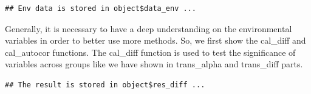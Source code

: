 \documentclass[
]{book}
\newenvironment{Shaded}{\begin{snugshade}}{\end{snugshade}}
\newcommand{\AttributeTok}[1]{\textcolor[rgb]{0.77,0.63,0.00}{#1}}
\newcommand{\CommentTok}[1]{\textcolor[rgb]{0.56,0.35,0.01}{\textit{#1}}}
\newcommand{\DecValTok}[1]{\textcolor[rgb]{0.00,0.00,0.81}{#1}}
\newcommand{\FunctionTok}[1]{\textcolor[rgb]{0.00,0.00,0.00}{#1}}
\newcommand{\NormalTok}[1]{#1}
\newcommand{\SpecialCharTok}[1]{\textcolor[rgb]{0.00,0.00,0.00}{#1}}
\newcommand{\StringTok}[1]{\textcolor[rgb]{0.31,0.60,0.02}{#1}}
\begin{document}
\begin{verbatim}
## Env data is stored in object$data_env ...
\end{verbatim}

Generally, it is necessary to have a deep understanding on the environmental variables in order to better use more methods.
So, we first show the cal\_diff and cal\_autocor functions.
The cal\_diff function is used to test the significance of variables across groups like we have shown in trans\_alpha and trans\_diff parts.

\begin{Shaded}
\end{Shaded}

\begin{verbatim}
## The result is stored in object$res_diff ...
\end{verbatim}
\end{document}
